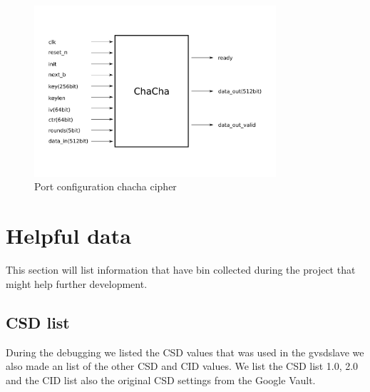 \documentclass[]{article}
\begin{document}
\begin{figure}[h]
	\centering
	\includegraphics[width=0.8\textwidth]{ilustrations/chacha.pdf}
	\caption{Port configuration chacha cipher}
	\label{fig:chacha}
\end{figure}


\section{Helpful data}
This section will list information that have bin collected during the project that might help further development.

\subsection{CSD list}
During the debugging we listed the CSD values that was used in the \gls{gvsdslave} we also made an list of the other CSD and CID values.
We list the CSD list 1.0, 2.0 and the CID list also the original CSD settings from the Google Vault.
\end{document}
